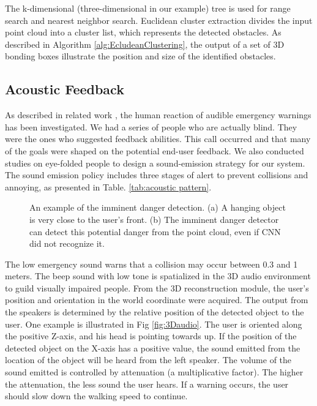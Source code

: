 \documentclass{ieeeaccess}
\begin{document}
The k-dimensional (three-dimensional in our example) tree is used for range search and nearest neighbor search. Euclidean cluster extraction divides the input point cloud into a cluster list, which represents the detected obstacles. As described in Algorithm \ref{alg:EcludeanClustering}, the output of a set of 3D bonding boxes illustrate the position and size of the identified obstacles.




\subsection{Acoustic Feedback}
As described in related work \cite{IEEEexample:kayukawa2019bbeep} \cite{IEEEexample:edworthy1991improving}, the human reaction of audible emergency warnings has been investigated. We had a series of people who are actually blind. They were the ones who suggested feedback abilities. This call occurred and that many of the goals were shaped on the potential end-user feedback. We also conducted studies on eye-folded people to design a sound-emission strategy for our system. The sound emission policy includes three stages of alert to prevent collisions and annoying, as presented in Table. \ref{tab:acoustic pattern}.

\begin{figure}
    \centering
    \caption{An example of the imminent danger detection. (a) A hanging object is very close to the user's front. (b) The imminent danger detector can detect this potential danger from the point cloud, even if CNN did not recognize it.}%
    \label{fig:urgent_danger_detection}
\end{figure}




The low emergency sound warns that a collision may occur between 0.3 and 1 meters. The beep sound with low tone is spatialized in the 3D audio environment to guild visually impaired people. From the 3D reconstruction module, the user's position and orientation in the world coordinate were acquired. The output from the speakers is determined by the relative position of the detected object to the user. One example is illustrated in Fig \ref{fig:3Daudio}. The user is oriented along the positive Z-axis, and his head is pointing towards up. If the position of the detected object on the X-axis has a positive value, the sound emitted from the location of the object will be heard from the left speaker. The volume of the sound emitted is controlled by attenuation (a multiplicative factor). The higher the attenuation, the less sound the user hears. If a warning occurs, the user should slow down the walking speed to continue.
\end{document}
